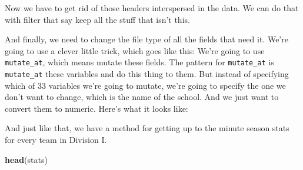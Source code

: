 \documentclass[]{book}
\newenvironment{Shaded}{\begin{snugshade}}{\end{snugshade}}
\newcommand{\KeywordTok}[1]{\textcolor[rgb]{0.13,0.29,0.53}{\textbf{#1}}}
\newcommand{\NormalTok}[1]{#1}
\newcommand{\OperatorTok}[1]{\textcolor[rgb]{0.81,0.36,0.00}{\textbf{#1}}}
\newcommand{\StringTok}[1]{\textcolor[rgb]{0.31,0.60,0.02}{#1}}
\begin{document}
Now we have to get rid of those headers interspersed in the data. We can do that with filter that say keep all the stuff that isn't this.

\begin{Shaded}
\end{Shaded}

And finally, we need to change the file type of all the fields that need it. We're going to use a clever little trick, which goes like this: We're going to use \texttt{mutate\_at}, which means mutate these fields. The pattern for \texttt{mutate\_at} is \texttt{mutate\_at} these variables and do this thing to them. But instead of specifying which of 33 variables we're going to mutate, we're going to specify the one we don't want to change, which is the name of the school. And we just want to convert them to numeric. Here's what it looks like:

\begin{Shaded}
\end{Shaded}

And just like that, we have a method for getting up to the minute season stats for every team in Division I.

\begin{Shaded}
\begin{Highlighting}[]
\KeywordTok{head}\NormalTok{(stats)}
\end{Highlighting}
\end{Shaded}
\end{document}
